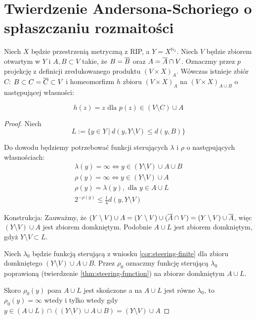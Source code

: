 \section{Twierdzenie Andersona-Schoriego o spłaszczaniu rozmaitości}

\begin{lem}
  Niech $X$ będzie przestrzenią metryczną z RIP, a $Y = X^{\mathbb{N}_1}$. Niech $V$ będzie zbiorem otwartym w $Y$ i $A, B \subset V$ takie, że $B = \overline{B}$ oraz $A = \overline{A} \cap V$. Oznaczmy przez $p$ projekcję z definicji zredukowanego produktu $(V \times X)_A$. Wówczas istnieje zbiór $C$: $B \subset C = \overline{C} \subset V$ i homeomorfizm $h$ zbioru $(V \times X)_A$ na $(V \times X)_{A \cup B}$ o następującej własności:
  
  \begin{equation} \label{eq:as-lem-1}
  h(z) = z \mbox{ dla } p(z) \in (V \setminus C) \cup A
  \end{equation}
  
  \begin{proof}
    Niech
    \[L := \{y \in Y\ |\ d(y, Y \setminus V) \leq d(y, B)\}\]
    
    Do dowodu będziemy potrzebować funkcji sterujących $\lambda$ i $\rho$ o następujących własnościach:
    \begin{gather}
      \label{lambda-infty} \lambda(y) = \infty \Leftrightarrow y \in (Y \setminus V) \cup A \cup B \\
      \label{rho-infty} \rho(y) = \infty \Leftrightarrow y \in (Y \setminus V) \cup A \\
      \label{rho-eq-lambda} \rho(y) = \lambda(y), \mbox{ dla } y \in A \cup L \\
      \label{rho-dist} 2^{-\rho(y)} \leq \frac{1}{4} d(y, Y \setminus V)
    \end{gather}
    
    Konstrukcja:
    Zauważmy, że $(Y \setminus V) \cup A = (Y \setminus V) \cup (\overline{A} \cap V) = (Y \setminus V) \cup \overline{A}$, więc $(Y \setminus V) \cup A$ jest zbiorem domkniętym. Podobnie $A \cup L$ jest zbiorem domkniętym, gdyż $Y \setminus V \subset L$.
    
    Niech $\lambda_0$ będzie funkcją sterującą z wniosku \ref{cor:steering-finite} dla zbioru domkniętego $(Y \setminus V) \cup A \cup B$. Przez $\rho_0$ oznaczmy funkcję sterującą $\lambda_0$ poprawioną (twierdzenie \ref{thm:steering-function}) na zbiorze domkniętym $A \cup L$.
    
    Skoro $\rho_0(y)$ poza $A \cup L$ jest skończone a na $A \cup L$ jest równe $\lambda_0$, to $\rho_0(y) = \infty$ wtedy i tylko wtedy gdy $y \in (A \cup L) \cap ((Y \setminus V) \cup A \cup B) = (Y \setminus V) \cup A$
    

\end{proof}
\end{lem}
